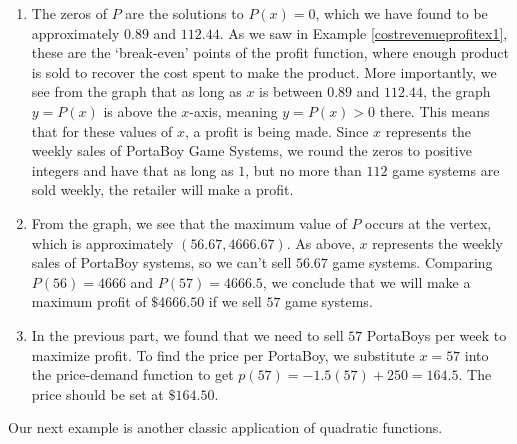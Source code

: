 {\begin{enumerate}


\item  The zeros of $P$ are the solutions to $P(x)=0$, which we have found to be approximately $0.89$ and $112.44$.  As we saw in Example \ref{costrevenueprofitex1}, these are the `break-even' points of the profit function, where enough product is sold to recover the cost spent to make the product.  More importantly, we see from the graph that as long as $x$ is between $0.89$ and $112.44$, the graph $y=P(x)$ is above the $x$-axis, meaning $y = P(x) > 0$ there.  This means that for these values of $x$, a profit is being made.  Since $x$ represents the weekly sales of PortaBoy Game Systems, we round the zeros to positive integers and have that as long as $1$, but no more than $112$ game systems are sold weekly, the retailer will make a profit.

\item  From the graph, we see that the maximum value of $P$ occurs at the vertex, which is approximately $(56.67,4666.67)$.  As above, $x$ represents the weekly sales of PortaBoy systems, so we can't sell $56.67$ game systems.  Comparing $P(56) = 4666$ and $P(57)=4666.5$, we conclude that we will make a maximum profit of $\$ 4666.50$ if we sell $57$ game systems.

\item  In the previous part, we found that we need to sell $57$ PortaBoys per week to maximize profit.  To find the price per PortaBoy, we substitute $x=57$ into the price-demand function to get  $p(57) = -1.5(57)+250 = 164.5$.   The price should be set at $\$164.50$. 

\end{enumerate}
}

\medskip

Our next example is another classic application of quadratic functions.

\pagebreak

